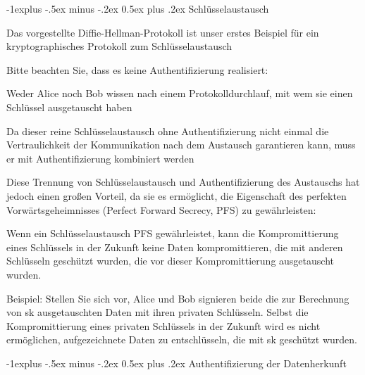 \documentclass[a4paper]{article}
\makeatletter
\renewcommand{\subsection}{\@startsection{subsection}{2}{0mm}%
 {-1explus -.5ex minus -.2ex}%
 {0.5ex plus .2ex}%
 {\normalfont\normalsize\bfseries}}
\makeatother
\begin{document}
\begin{multicols}{3}
      \subsection{Schlüsselaustausch}

      \begin{itemize*}
            \item
            Das vorgestellte Diffie-Hellman-Protokoll ist unser erstes Beispiel
            für ein kryptographisches Protokoll zum Schlüsselaustausch
            \item
            Bitte beachten Sie, dass es keine Authentifizierung realisiert:

            \begin{itemize*}
                  \item Weder Alice noch Bob wissen nach einem Protokolldurchlauf, mit wem sie einen Schlüssel ausgetauscht haben
                  \item Da dieser reine Schlüsselaustausch ohne Authentifizierung nicht einmal die Vertraulichkeit der Kommunikation nach dem Austausch garantieren kann, muss er mit Authentifizierung kombiniert werden
            \end{itemize*}
            \item
            Diese Trennung von Schlüsselaustausch und Authentifizierung des
            Austauschs hat jedoch einen großen Vorteil, da sie es ermöglicht, die
            Eigenschaft des perfekten Vorwärtsgeheimnisses (Perfect Forward
            Secrecy, PFS) zu gewährleisten:

            \begin{itemize*}
                  \item Wenn ein Schlüsselaustausch PFS gewährleistet, kann die Kompromittierung eines Schlüssels in der Zukunft keine Daten kompromittieren, die mit anderen Schlüsseln geschützt wurden, die vor dieser Kompromittierung ausgetauscht wurden.
                  \item Beispiel: Stellen Sie sich vor, Alice und Bob signieren beide die zur Berechnung von sk ausgetauschten Daten mit ihren privaten Schlüsseln. Selbst die Kompromittierung eines privaten Schlüssels in der Zukunft wird es nicht ermöglichen, aufgezeichnete Daten zu entschlüsseln, die mit sk geschützt wurden.
            \end{itemize*}
      \end{itemize*}


      \subsection{Authentifizierung der
            Datenherkunft}


\end{multicols}
\end{document}
